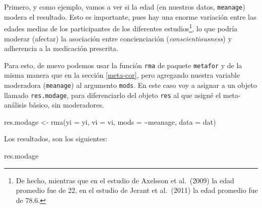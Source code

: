 \documentclass[
  bookmarksnumbered]{article}
\newenvironment{Shaded}{\begin{snugshade}}{\end{snugshade}}
\newcommand{\AttributeTok}[1]{\textcolor[rgb]{0.00,0.34,0.68}{#1}}
\newcommand{\FunctionTok}[1]{\textcolor[rgb]{0.39,0.29,0.61}{#1}}
\newcommand{\NormalTok}[1]{\textcolor[rgb]{0.12,0.11,0.11}{#1}}
\newcommand{\OtherTok}[1]{\textcolor[rgb]{0.00,0.43,0.16}{#1}}
\newcommand{\SpecialCharTok}[1]{\textcolor[rgb]{0.24,0.68,0.91}{#1}}
\begin{document}
Primero, y como ejemplo, vamos a ver si la edad (en nuestros datos, \texttt{meanage}) modera el resultado. Esto es importante, pues hay una enorme variación entre las edades medias de los participantes de los diferentes estudios\footnote{De hecho, mientras que en el estudio de Axelsson et al.~(2009) la edad promedio fue de 22, en el estudio de Jerant et al.~(2011) la edad promedio fue de 78.6.}, lo que podría moderar (afectar) la asociación entre concienciación (\emph{conscientiousness}) y adherencia a la medicación prescrita.

Para esto, de nuevo podemos usar la función \texttt{rma} de paquete \texttt{metafor} y de la misma manera que en la sección \ref{meta-cor}, pero agregando nuestra variable moderadora (\texttt{meanage}) al argumento \texttt{mods}. En este caso voy a asignar a un objeto llamado \texttt{res.modage}, para diferenciarlo del objeto \texttt{res} al que asigné el meta-análisis básico, sin moderadores.

\begin{Shaded}
\begin{Highlighting}[]
\NormalTok{res.modage }\OtherTok{\textless{}{-}} \FunctionTok{rma}\NormalTok{(}\AttributeTok{yi =}\NormalTok{ yi, }\AttributeTok{vi =}\NormalTok{ vi, }\AttributeTok{mods =} \SpecialCharTok{\textasciitilde{}}\NormalTok{meanage, }\AttributeTok{data =}\NormalTok{ dat)}
\end{Highlighting}
\end{Shaded}

Los resultados, son los siguientes:

\begin{Shaded}
\begin{Highlighting}[]
\NormalTok{res.modage}
\end{Highlighting}
\end{Shaded}
\end{document}
